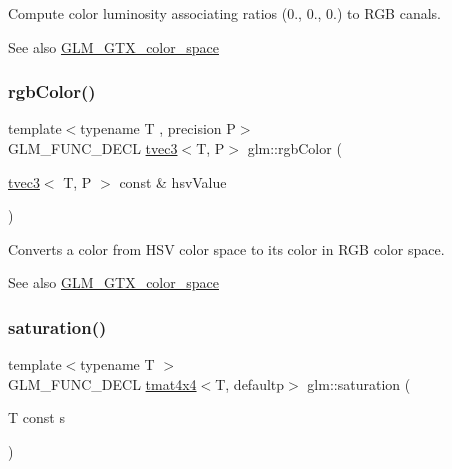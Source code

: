 Compute color luminosity associating ratios (0., 0., 0.) to R\+GB canals. \begin{DoxySeeAlso}{See also}
\hyperlink{group__gtx__color__space}{G\+L\+M\+\_\+\+G\+T\+X\+\_\+color\+\_\+space} 
\end{DoxySeeAlso}
\mbox{\label{group__gtx__color__space_ga36b0619e31daf57bc4a54dac2dcf34b7}} 
\subsubsection{\texorpdfstring{rgb\+Color()}{rgbColor()}}
{\footnotesize\ttfamily template$<$typename T , precision P$>$ \\
G\+L\+M\+\_\+\+F\+U\+N\+C\+\_\+\+D\+E\+CL \hyperlink{structglm_1_1tvec3}{tvec3}$<$T, P$>$ glm\+::rgb\+Color (\begin{DoxyParamCaption}\item[{\hyperlink{structglm_1_1tvec3}{tvec3}$<$ T, P $>$ const \&}]{hsv\+Value }\end{DoxyParamCaption})}

Converts a color from H\+SV color space to its color in R\+GB color space. \begin{DoxySeeAlso}{See also}
\hyperlink{group__gtx__color__space}{G\+L\+M\+\_\+\+G\+T\+X\+\_\+color\+\_\+space} 
\end{DoxySeeAlso}
\mbox{\label{group__gtx__color__space_gafecfb15d58da8445103745af3348e516}} 
\subsubsection{\texorpdfstring{saturation()}{saturation()}\hspace{0.1cm}{\footnotesize\ttfamily [1/3]}}
{\footnotesize\ttfamily template$<$typename T $>$ \\
G\+L\+M\+\_\+\+F\+U\+N\+C\+\_\+\+D\+E\+CL \hyperlink{structglm_1_1tmat4x4}{tmat4x4}$<$T, defaultp$>$ glm\+::saturation (\begin{DoxyParamCaption}\item[{T const}]{s }\end{DoxyParamCaption})}

